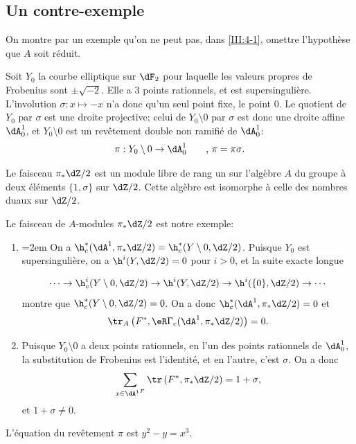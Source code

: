 \subsection{Un contre-exemple}\label{III:4-5}

On montre par un exemple qu'on ne peut pas, dans \ref{III:4-1}, omettre 
l'hypothèse que $A$ soit réduit.

Soit $Y_0$ la courbe elliptique sur $\dF_2$ pour laquelle les valeurs propres 
de Frobenius sont $\pm \sqrt{-2}$. Elle a $3$ points rationnels, et est 
supersingulière. L'involution $\sigma:x\mapsto -x$ n'a donc qu'un seul point 
fixe, le point $0$. Le quotient de $Y_0$ par $\sigma$ est une droite projective; 
celui de $Y_0\setminus 0$ par $\sigma$ est donc une droite affine $\dA_0^1$, et 
$Y_0\setminus 0$ est un revêtement double non ramifié de $\dA_0^1$:
\[
  \pi:Y_0\setminus 0 \to \dA_0^1 \qquad \text{, $\pi=\pi\sigma$.}
\]

Le faisceau $\pi_*\dZ/2$ est un module libre de rang un sur l'algèbre $A$ du 
groupe à deux éléments $\{1,\sigma\}$ sur $\dZ/2$. Cette algèbre est 
isomorphe à celle des nombres duaux sur $\dZ/2$. 

Le faisceau de $A$-modules $\pi_*\dZ/2$ est notre exemple:
\begin{enumerate}[\indent a)]
  \item \begingroup
\emergencystretch=2em\relax
On a 
    $\h_c^*(\dA^1,\pi_*\dZ/2) = \h_c^*(Y\setminus 0,\dZ/2)$. 
    Puisque $Y_0$ est supersingulière, on a $\h^i(Y,\dZ/2)=0$ pour $i>0$, et 
    la suite exacte longue\par
\endgroup 
    \[
      \cdots \to \h_c^i(Y\setminus 0,\dZ/2) \to \h^i(Y,\dZ/2) \to \h^i(\{0\},\dZ/2) \to \cdots
    \]
    montre que $\h_c^*(Y\setminus 0,\dZ/2)=0$. On a donc 
    $\h_c^*(\dA^1,\pi_*\dZ/2)=0$ et 
    \[
      \tr_A\left(F^*,\eR\Gamma_c(\dA^1,\pi_*\dZ/2)\right) = 0 \text{.}
    \]
  \item Puisque $Y_0\setminus 0$ a deux points rationnels, en l'un des points 
    rationnels de $\dA_0^1$, la substitution de Frobenius est l'identité, et 
    en l'autre, c'est $\sigma$. On a donc 
    \[
      \sum_{x\in {\dA^1}^F} \tr\left(F^*,\pi_*\dZ/2\right) = 1+\sigma \text{,}
    \]
    et $1+\sigma\ne 0$.
\end{enumerate}

L'équation du revêtement $\pi$ est $y^2-y=x^3$.


